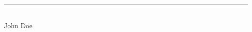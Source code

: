 \documentclass[a4paper, 11pt]{article}
\begin{document}







\newpage






\vfill

\vspace{10pt}
\noindent\rule{5.0cm}{0.4pt}\\[2pt]
{\small John Doe}
\end{document}
